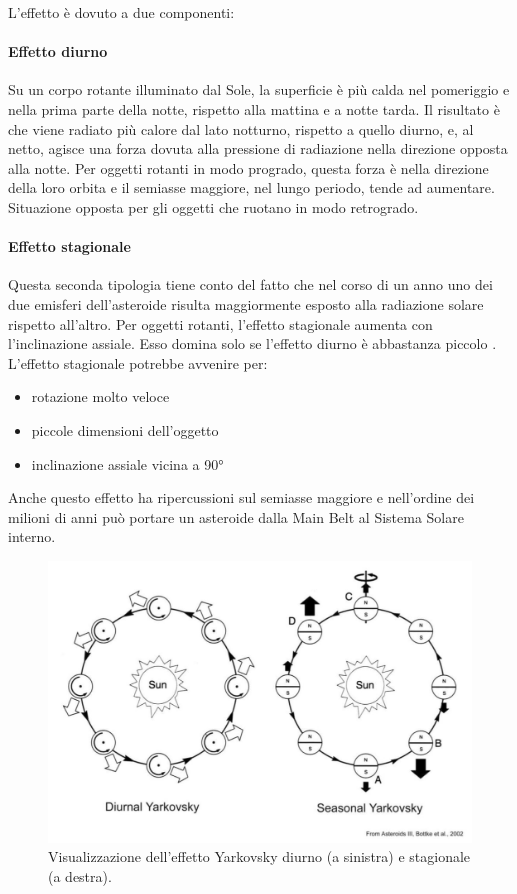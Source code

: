 \documentclass[a4paper,11pt,openright]{book}
\begin{document}
L’effetto è dovuto a due componenti:

\paragraph*{Effetto diurno}
Su un corpo rotante illuminato dal Sole, la superficie è più calda nel pomeriggio e nella prima parte della notte, rispetto alla mattina e a notte tarda. Il risultato è che viene radiato più calore dal lato notturno, rispetto a quello diurno, e, al netto, agisce una forza dovuta alla pressione di radiazione nella direzione opposta alla notte. Per oggetti rotanti in modo progrado, questa forza è nella direzione della loro orbita e il semiasse maggiore, nel lungo periodo, tende ad aumentare. Situazione opposta per gli oggetti che ruotano in modo retrogrado.

\paragraph*{Effetto stagionale}
Questa seconda tipologia tiene conto del fatto che nel corso di un anno uno dei due emisferi dell’asteroide risulta maggiormente esposto alla radiazione solare rispetto all’altro. Per oggetti rotanti, l’effetto stagionale aumenta con l’inclinazione assiale. Esso domina solo se l’effetto diurno è abbastanza piccolo \citep{Vokrouhlicky_1999}.
L’effetto stagionale potrebbe avvenire per:

\begin{itemize}
    \item rotazione molto veloce
    \item piccole dimensioni dell’oggetto
    \item inclinazione assiale vicina a 90°
\end{itemize}

Anche questo effetto ha ripercussioni sul semiasse maggiore e nell'ordine dei milioni di anni può portare un asteroide dalla Main Belt al Sistema Solare interno.

\begin{figure}[!h]
    \centering
    \includegraphics[scale=0.38]{figure/yark.jpg}
    \caption[Visualizzazione dell'effetto Yarkovsky diurno e stagionale.]{Visualizzazione dell'effetto Yarkovsky diurno (a sinistra) e stagionale (a destra). \citep{bottke_yarkovsky_2002}}
    \label{fig:yark}
\end{figure}
\end{document}
